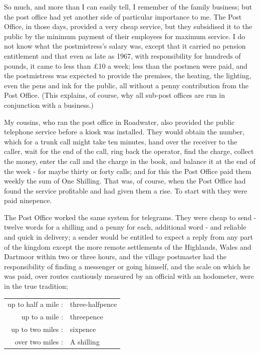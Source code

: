 So much, and more than I can easily tell, I remember of the family business; but the post office had yet another side of particular importance to me. 
The Post Office, in those days, provided a very cheap service, but they subsidised it to the public by the minimum payment of their employees for maximum service. I do not know what the postmistress's salary was, except that it carried no pension entitlement and that even as late as 1967, with responsibility for hundreds of pounds, it came to less than £10 a week; less than the postmen were paid, and the postmistress was expected to provide the premises, the heating, the lighting, even the pens and ink for the public, all without a penny contribution from the Post Office. (This explains, of course, why all sub-post offices are run in conjunction with a business.)

My cousins, who ran the post office in Roadwater, also provided the public telephone service before a kiosk was installed. They would obtain the number, which for a trunk call might take ten minutes, hand over the receiver to the caller, wait for the end of the call, ring back the operator, find the charge, collect the money, enter the call and the charge in the book, and balance it at the end of the week - for maybe thirty or forty calls; and for this the Post Office paid them weekly the sum of One Shilling. That was, of course, when the Post Office had found the service profitable and had given them a rise. To start with they were paid ninepence.

The Post Office worked the same system for telegrams. They were cheap to send - twelve words for a shilling and a penny for each, additional word - and reliable and quick in delivery; a sender would be entitled to expect a reply from any part of the kingdom except the more remote settlements of the Highlands, Wales and Dartmoor within two or three hours, and the village postmaster had the responsibility of finding a messenger or going himself, and the scale on which he was paid, over routes cautiously measured by an official with an hodometer, were in the true tradition;

\begin{table}
\centering
\begin{tabularx}{6cm}{@{}r<{:}@{\ }X@{}}
          up to half a mile & three-halfpence \\
  up to a mile & threepence \\
    up to two miles & sixpence \\
    over two miles  & A shilling \\
\end{tabularx}
\end{table}


